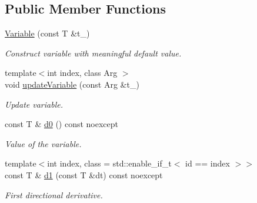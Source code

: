 \subsection*{Public Member Functions}
\begin{DoxyCompactItemize}
\item 
\hypertarget{structRFFGen_1_1Variable_a99bcfbe635b7a9c221d6ba3bb068921d}{\hyperlink{structRFFGen_1_1Variable_a99bcfbe635b7a9c221d6ba3bb068921d}{Variable} (const T \&t\-\_\-)}\label{structRFFGen_1_1Variable_a99bcfbe635b7a9c221d6ba3bb068921d}

\begin{DoxyCompactList}\small\item\em Construct variable with meaningful default value. \end{DoxyCompactList}\item 
\hypertarget{structRFFGen_1_1Variable_a5d6591b5a95842811ce015bbc98d8cb1}{{\footnotesize template$<$int index, class Arg $>$ }\\void \hyperlink{structRFFGen_1_1Variable_a5d6591b5a95842811ce015bbc98d8cb1}{update\-Variable} (const Arg \&t\-\_\-)}\label{structRFFGen_1_1Variable_a5d6591b5a95842811ce015bbc98d8cb1}

\begin{DoxyCompactList}\small\item\em Update variable. \end{DoxyCompactList}\item 
\hypertarget{structRFFGen_1_1Variable_abab2ca1e85b626e4bb656b97f899de74}{const T \& \hyperlink{structRFFGen_1_1Variable_abab2ca1e85b626e4bb656b97f899de74}{d0} () const noexcept}\label{structRFFGen_1_1Variable_abab2ca1e85b626e4bb656b97f899de74}

\begin{DoxyCompactList}\small\item\em Value of the variable. \end{DoxyCompactList}\item 
{\footnotesize template$<$int index, class  = std\-::enable\-\_\-if\-\_\-t$<$ id == index $>$$>$ }\\const T \& \hyperlink{structRFFGen_1_1Variable_a7950779c766f047ead4baa03ebaca3bc}{d1} (const T \&dt) const noexcept
\begin{DoxyCompactList}\small\item\em First directional derivative. \end{DoxyCompactList}\end{DoxyCompactItemize}


